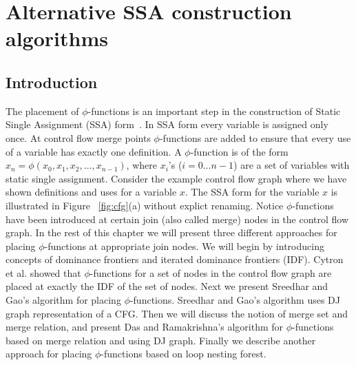 \chapter{Alternative SSA construction algorithms
   }
\graphicspath{{img/}{alternative_ssa_construction_algorithms/img/}{part1/alternative_ssa_construction_algorithms/img/}}


%


%


\section{Introduction}

The  placement  of $\phi$-functions
is an important step in the construction of Static Single Assignment 
(SSA) form~\cite{CytronEtAl91}.
 In SSA form
 every variable is assigned 
only once. At control flow merge points $\phi$-functions are added 
 to ensure that every use of a variable has exactly 
one definition. 
A $\phi$-function is of the form $x_n = \phi(x_0,x_1, x_2, \ldots, x_{n-1})$,
where $x_i$'s ($i = 0 \ldots n-1$) are a set of variables with static single assignment. 
Consider the example control flow graph where we have shown definitions and uses for 
a variable $x$. The SSA form for the variable $x$ is illustrated in Figure ~\ref{fig:cfg}(a)
without explict renaming. 
Notice $\phi$-functions
have been introduced at certain join (also called merge) nodes in the control flow graph.
In the rest of this chapter we will present three different approaches  for placing $\phi$-functions
at appropriate join nodes. We will begin by introducing concepts of dominance frontiers and
iterated dominance frontiers (IDF). Cytron et al. showed that $\phi$-functions for a set of nodes in the
control flow graph are
placed at exactly the IDF of the set of nodes. Next we present Sreedhar and Gao's algorithm for
placing $\phi$-functions. Sreedhar and Gao's algorithm uses DJ graph representation of a CFG.
Then we will discuss the notion of merge set and merge relation, and present
Das and Ramakrishna's algorithm for $\phi$-functions based on merge relation and using DJ graph. Finally
we describe another approach for placing $\phi$-functions based on loop nesting forest.

